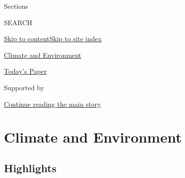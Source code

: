 Sections

SEARCH

\protect\hyperlink{site-content}{Skip to
content}\protect\hyperlink{site-index}{Skip to site index}

\href{https://www.nytimes.com/section/climate}{Climate and Environment}

\href{https://myaccount.nytimes.com/auth/login?response_type=cookie\&client_id=vi}{}

\href{https://www.nytimes.com/section/todayspaper}{Today's Paper}

Supported by

\protect\hyperlink{after-sponsor}{Continue reading the main story}

\hypertarget{climate-and-environment}{%
\section{Climate and Environment}\label{climate-and-environment}}

\hypertarget{highlights}{%
\subsection{Highlights}\label{highlights}}

